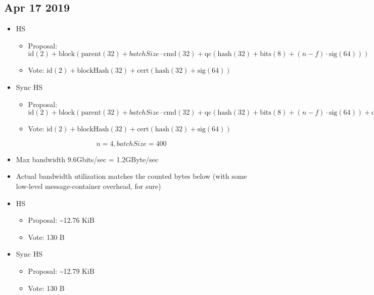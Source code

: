\documentclass{article}
\begin{document}
\newcommand{\bsize}{\mathit{batchSize}}
\begin{landscape}
\section{Apr 17 2019}
\begin{center}
\footnotesize
\begin{itemize}
    \item HS
\begin{itemize}
    \item Proposal: $\textrm{id}(2) + \textrm{block}(\textrm{parent}(32) + \bsize \cdot \textrm{cmd}(32) + \textrm{qc}(\textrm{hash}(32) + \textrm{bits}(8) + (n - f) \cdot \textrm{sig}(64)))$
    \item Vote: $\textrm{id}(2) + \textrm{blockHash}(32) + \textrm{cert}(\textrm{hash}(32) + \textrm{sig}(64))$
\end{itemize}
    \item Sync HS
\begin{itemize}
    \item Proposal: $\textrm{id}(2) + \textrm{block}(\textrm{parent}(32) + \bsize \cdot \textrm{cmd}(32) + \textrm{qc}(\textrm{hash}(32) + \textrm{bits}(8) + (n - f) \cdot \textrm{sig}(64)) + \textrm{qcRefHash}(32))$
    \item Vote: $\textrm{id}(2) + \textrm{blockHash}(32) + \textrm{cert}(\textrm{hash}(32) + \textrm{sig}(64))$
\end{itemize}
\end{itemize}
\[n = 4, \bsize = 400\]
\begin{itemize}
    \item Max bandwidth 9.6Gbits/sec = 1.2GByte/sec
    \item Actual bandwidth utilization matches the counted bytes below (with some low-level message-container overhead, for sure)
\end{itemize}
\begin{itemize}
    \item HS
\begin{itemize}
    \item Proposal: \textasciitilde12.76 KiB
    \item Vote: 130 B
\end{itemize}
    \item Sync HS
\begin{itemize}
    \item Proposal: \textasciitilde12.79 KiB
    \item Vote: 130 B
\end{itemize}
\end{itemize}


\end{center}
\end{landscape}
\end{document}

